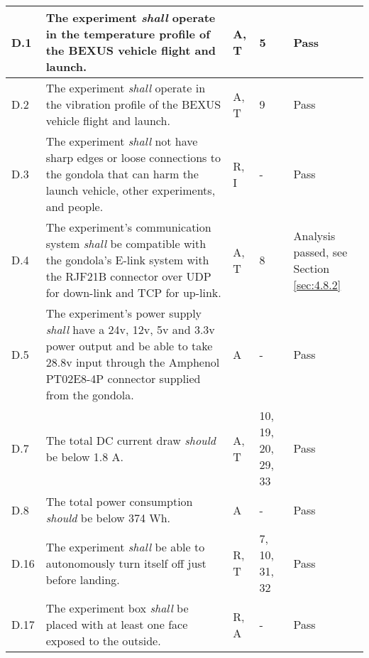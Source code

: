 \begin{longtable}[]{|m{}| m{} |m{} |m{}|m{}|}
D.1  & The experiment \textit{shall} operate in the temperature profile of the BEXUS vehicle flight and launch.\cite{BexusManual}                                                                         &       A, T       & 5            & Pass     \\ \hline
D.2  & The experiment \textit{shall} operate in the vibration profile of the BEXUS vehicle flight and launch.\cite{BexusManual}                                                                          &       A, T       & 9            &  Pass \\ \hline %
D.3  & The experiment \textit{shall} not have sharp edges or loose connections to the gondola that can harm the launch vehicle, other experiments, and people.                                                                                                           &      R, I      & -          &   Pass     \\ \hline %
D.4  & The experiment's communication system \textit{shall} be compatible with the gondola's E-link system with the RJF21B connector over UDP for down-link and TCP for up-link.                                                                             &      A, T        & 8            &    Analysis passed, see Section \ref{sec:4.8.2}    \\ \hline
D.5  & The experiment's power supply \textit{shall} have a 24v, 12v, 5v and 3.3v power output and be able to take 28.8v input through the Amphenol PT02E8-4P connector supplied from the gondola.                                                                                    &      A       &  -           & Pass      \\ \hline %
D.7  & The total DC current draw \textit{should} be below 1.8 A. &      A, T        & 10, 19, 20, 29, 33            & Pass        \\ \hline
D.8  & The total power consumption \textit{should} be below 374 Wh.& A & - & Pass \\ \hline %
D.16 & The experiment \textit{shall} be able to autonomously turn itself off just before landing.                                                                                       &       R, T      &  7, 10, 31, 32           &   Pass    \\ \hline
D.17 & The experiment box \textit{shall} be placed with at least one face exposed to the outside.                                                                                &     R, A         & -            &   Pass      

\end{longtable}
